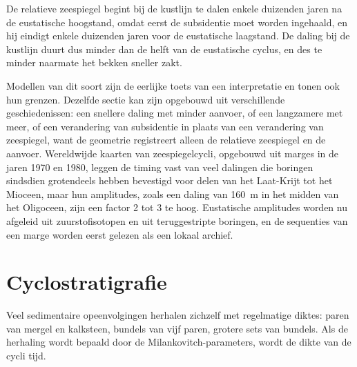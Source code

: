 \begin{omfigure}
\par{}\label{fig:b3:sequence-stratigraphy:section}
\end{omfigure}


De relatieve zeespiegel begint bij de kustlijn te dalen enkele duizenden jaren
na de eustatische hoogstand, omdat eerst de subsidentie moet worden ingehaald,
en hij eindigt enkele duizenden jaren voor de eustatische laagstand. De daling bij
de kustlijn duurt dus minder dan de helft van de eustatische cyclus, en des te
minder naarmate het bekken sneller zakt.

Modellen van dit soort zijn de eerlijke toets van een interpretatie en tonen ook
hun grenzen. Dezelfde sectie kan zijn opgebouwd uit verschillende geschiedenissen: een snellere
daling met minder aanvoer, of een langzamere met meer, of een verandering van subsidentie
in plaats van een verandering van zeespiegel, want de geometrie registreert alleen de relatieve zeespiegel
en de aanvoer. Wereldwijde kaarten van zeespiegelcycli, opgebouwd uit marges in
de jaren 1970 en 1980, leggen de timing vast van veel dalingen die boringen sindsdien
grotendeels hebben bevestigd voor delen van het Laat-Krijt tot het Mioceen, maar hun
amplitudes, zoals een daling van \qty{160}{m} in het midden van het Oligoceen, zijn
een factor 2 tot 3 te hoog. Eustatische amplitudes worden nu afgeleid uit
zuurstofisotopen en uit teruggestripte boringen, en de sequenties van een marge worden
eerst gelezen als een lokaal archief.

\section{Cyclostratigrafie}\label{sec:b3:sequence-stratigraphy:cyclo}

Veel sedimentaire opeenvolgingen herhalen zichzelf met regelmatige diktes: paren
van mergel en kalksteen, bundels van vijf paren, grotere sets van bundels. Als
de herhaling wordt bepaald door de Milankovitch-parameters, wordt de dikte van de
cycli tijd.

